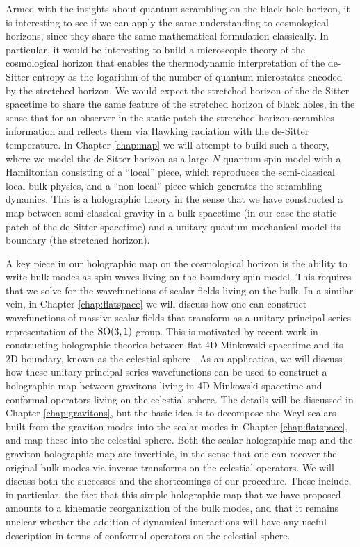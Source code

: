 \documentclass{brownthesis}
\begin{document}
Armed with the insights about quantum scrambling on the black hole horizon, it is interesting to see if we can apply the same understanding to cosmological horizons, since they share the same mathematical formulation classically. In particular, it would be interesting to build a microscopic theory of the cosmological horizon that enables the thermodynamic interpretation of the de-Sitter entropy as the logarithm of the number of quantum microstates encoded by the stretched horizon. We would expect the stretched horizon of the de-Sitter spacetime to share the same feature of the stretched horizon of black holes, in the sense that for an observer in the static patch the stretched horizon scrambles information and reflects them via Hawking radiation with the de-Sitter temperature. In Chapter \ref{chap:map} we will attempt to build such a theory, where we model the de-Sitter horizon as a large-$N$ quantum spin model with a Hamiltonian consisting of a ``local'' piece, which reproduces the semi-classical local bulk physics, and a ``non-local'' piece which generates the scrambling dynamics. This is a holographic theory in the sense that we have constructed a map between semi-classical gravity in a bulk spacetime (in our case the static patch of the de-Sitter spacetime) and a unitary quantum mechanical model its boundary (the stretched horizon).

A key piece in our holographic map on the cosmological horizon is the ability to write bulk modes as spin waves living on the boundary spin model. This requires that we solve for the wavefunctions of scalar fields living on the bulk. In a similar vein, in Chapter \ref{chap:flatspace} we will discuss how one can construct wavefunctions of massive scalar fields that transform as a unitary principal series representation of the $\rm SO(3,1)$ group. This is motivated by recent work in constructing holographic theories between flat 4D Minkowski spacetime and its 2D boundary, known as the celestial sphere \cite{deBoer:2003vf,Kapec:2014opa,Kapec:2016jld,Cheung:2016iub}. As an application, we will discuss how these unitary principal series wavefunctions can be used to construct a holographic map between gravitons living in 4D Minkowski spacetime and conformal operators living on the celestial sphere. The details will be discussed in Chapter \ref{chap:gravitons}, but the basic idea is to decompose the Weyl scalars built from the graviton modes into the scalar modes in Chapter \ref{chap:flatspace}, and map these into the celestial sphere. Both the scalar holographic map and the graviton holographic map are invertible, in the sense that one can recover the original bulk modes via inverse transforms on the celestial operators. We will discuss both the successes and the shortcomings of our procedure. These include, in particular, the fact that this simple holographic map that we have proposed amounts to a kinematic reorganization of the bulk modes, and that it remains unclear whether the addition of dynamical interactions will have any useful description in terms of conformal operators on the celestial sphere.
\end{document}
